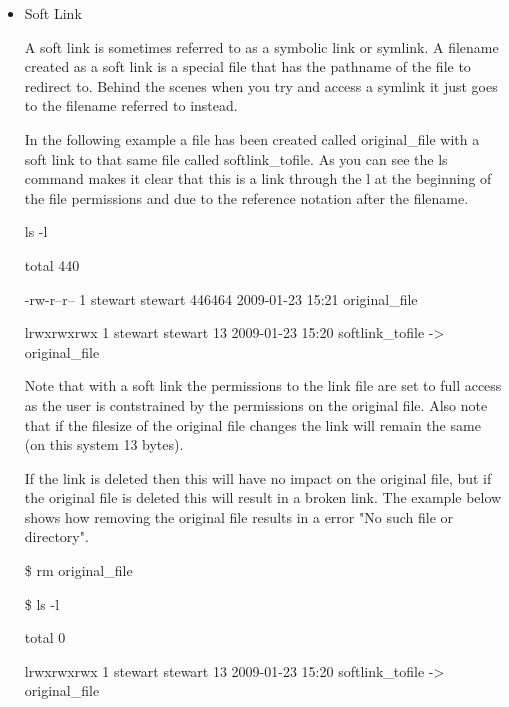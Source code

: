 \documentclass{article}
\begin{document}
\begin{itemize}
	

\item Soft Link

A soft link is sometimes referred to as a symbolic link or symlink. A filename created as a soft link is a special file that has the pathname of the file to redirect to. Behind the scenes when you try and access a symlink it just goes to the filename referred to instead.

	In the following example a file has been created called original\_file with a soft link to that same file called softlink\_tofile. As you can see the ls command makes it clear that this is a link through the l at the beginning of the file permissions and due to the reference notation after the filename.

\hspace{10mm}ls -l

\hspace{10mm}total 440

\hspace{10mm}-rw-r--r-- 1 stewart stewart 446464 2009-01-23 15:21 original\_file

\hspace{10mm}lrwxrwxrwx 1 stewart stewart     13 2009-01-23 15:20 softlink\_tofile -> original\_file

\hspace{10mm}Note that with a soft link the permissions to the link file are set to full access as the user is contstrained by the permissions on the original file. Also note that if the filesize of the original file changes the link will remain the same (on this system 13 bytes).

\hspace{10mm}If the link is deleted then this will have no impact on the original file, but if the original file is deleted this will result in a broken link. The example below shows how removing the original file results in a error "No such file or directory".

\hspace{10mm} \$ rm original\_file 



\hspace{10mm} \$ ls -l

\hspace{10mm}total 0

\hspace{10mm}lrwxrwxrwx 1 stewart stewart 13 2009-01-23 15:20 softlink\_tofile -> original\_file




\end{itemize}
\end{document}
